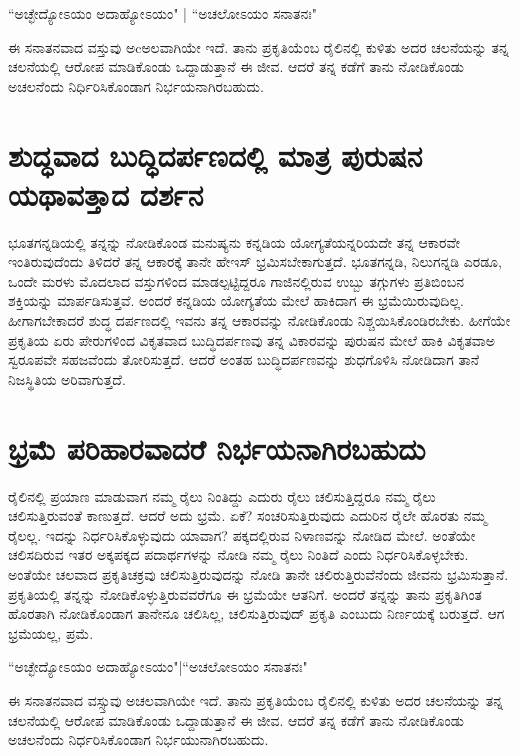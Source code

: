 \begin{shloka}
``ಅಚ್ಛೇದ್ಯೋಽಯಂ ಅದಾಹ್ಯೋಽಯಂ" | ``ಅಚಲೋಽಯಂ ಸನಾತನಃ"
\end{shloka}

ಈ ಸನಾತನವಾದ ವಸ್ತುವು ಅcಅಲವಾಗಿಯೇ ಇದೆ. ತಾನು ಪ್ರಕೃತಿಯೆಂಬ ರೈಲಿನಲ್ಲಿ ಕುಳಿತು ಅದರ ಚಲನೆಯನ್ನು ತನ್ನ ಚಲನೆಯಲ್ಲಿ ಆರೋಪ ಮಾಡಿಕೊಂಡು ಒದ್ದಾಡುತ್ತಾನೆ ಈ ಜೀವ. ಆದರೆ ತನ್ನ ಕಡೆಗೆ ತಾನು ನೋಡಿಕೊಂಡು ಅಚಲನೆಂದು ನಿರ್ಧಿರಿಸಿಕೊಂಡಾಗ ನಿರ್ಭಯನಾಗಿರಬಹುದು.

\section*{ಶುದ್ಧವಾದ ಬುದ್ಧಿದರ್ಪಣದಲ್ಲಿ ಮಾತ್ರ ಪುರುಷನ ಯಥಾವತ್ತಾದ ದರ್ಶನ}

ಭೂತಗನ್ನಡಿಯಲ್ಲಿ  ತನ್ನನ್ನು ನೋಡಿಕೊಂಡ ಮನುಷ್ಯನು ಕನ್ನಡಿಯ ಯೋಗ್ಯತೆಯನ್ನರಿಯದೇ ತನ್ನ ಆಕಾರವೇ ಇಂತಿರುವುದೆಂದು ತಿಳಿದರೆ ತನ್ನ ಆಕಾರಕ್ಕೆ ತಾನೇ ಹೇಇಸ್ ಭ್ರಮಿಸಬೇಕಾಗುತ್ತದೆ. ಭೂತಗನ್ನಡಿ, ನಿಲುಗನ್ನಡಿ ಎರಡೂ, ಒಂದೇ ಮರಳು ಮೊದಲಾದ ವಸ್ತುಗಳಿಂದ ಮಾಡಲ್ಪಟ್ಟಿದ್ದರೂ ಗಾಜಿನಲ್ಲಿರುವ ಉಬ್ಬು ತಗ್ಗುಗಳು ಪ್ರತಿಬಿಂಬನ ಶಕ್ತಿಯನ್ನು ಮಾರ್ಪಡಿಸುತ್ತವೆ. ಅಂದರೆ ಕನ್ನಡಿಯ ಯೋಗ್ಯತೆಯ ಮೇಲೆ ಹಾಕಿದಾಗ ಈ ಭ್ರಮೆಯಿರುವುದಿಲ್ಲ. ಹೀಗಾಗಬೇಕಾದರೆ ಶುದ್ಧ ದರ್ಪಣದಲ್ಲಿ ಇವನು ತನ್ನ ಆಕಾರವನ್ನು ನೋಡಿಕೊಂಡು ನಿಶ್ಚಯಿಸಿಕೊಂಡಿರಬೇಕು. ಹೀಗೆಯೇ ಪ್ರಕೃತಿಯ ಏರು ಪೇರುಗಳಿಂದ ವಿಕೃತವಾದ ಬುದ್ಧಿದರ್ಪಣವು ತನ್ನ ವಿಕಾರವನ್ನು ಪುರುಷನ ಮೇಲೆ ಹಾಕಿ ವಿಕೃತವಾಅ ಸ್ವರೂಪವೇ ಸಹಜವೆಂದು ತೋರಿಸುತ್ತದೆ. ಆದರೆ ಅಂತಹ ಬುದ್ಧಿದರ್ಪಣವನ್ನು ಶುಧಗೊಳಿಸಿ ನೋಡಿದಾಗ ತಾನೆ ನಿಜಸ್ಥಿತಿಯ ಅರಿವಾಗುತ್ತದೆ.

\section*{ಭ್ರಮೆ ಪರಿಹಾರವಾದರೆ ನಿರ್ಭಯನಾಗಿರಬಹುದು}

ರೈಲಿನಲ್ಲಿ ಪ್ರಯಾಣ ಮಾಡುವಾಗ ನಮ್ಮ ರೈಲು ನಿಂತಿದ್ದು ಎದುರು ರೈಲು ಚಲಿಸುತ್ತಿದ್ದರೂ ನಮ್ಮ ರೈಲು ಚಲಿಸುತ್ತಿರುವಂತೆ ಕಾಣುತ್ತದೆ. ಆದರೆ ಅದು ಭ್ರಮೆ. ಏಕೆ? ಸಂಚರಿಸುತ್ತಿರುವುದು ಎದುರಿನ ರೈಲೇ ಹೊರತು ನಮ್ಮ ರೈಲಲ್ಲ. ಇದನ್ನು ನಿರ್ಧರಿಸಿಕೊಳ್ಳುವುದು ಯಾವಾಗ? ಪಕ್ಕದಲ್ಲಿರುವ ನಿಳಾಣವನ್ನು ನೋಡಿದ ಮೇಲೆ. ಅಂತೆಯೇ ಚಲಿಸದಿರುವ ಇತರ ಅಕ್ಕಪಕ್ಕದ ಪದಾರ್ಥಗಳನ್ನು ನೋಡಿ ನಮ್ಮ ರೈಲು ನಿಂತಿದೆ ಎಂದು ನಿರ್ಧರಿಸಿಕೊಳ್ಳಬೇಕು. ಅಂತೆಯೇ ಚಲವಾದ ಪ್ರಕೃತಿಚಕ್ರವು ಚಲಿಸುತ್ತಿರುವುದನ್ನು ನೋಡಿ ತಾನೇ ಚಲಿರುತ್ತಿರುವೆನೆಂದು ಜೀವನು ಭ್ರಮಿಸುತ್ತಾನೆ. ಪ್ರಕೃತಿಯಲ್ಲಿ ತನ್ನನ್ನು ನೋಡಿಕೊಳ್ಳುತ್ತಿರುವವರೆಗೂ ಈ ಭ್ರಮೆಯೇ ಆತನಿಗೆ. ಅಂದರೆ ತನ್ನನ್ನು ತಾನು ಪ್ರಕೃತಿಗಿಂತ ಹೊರತಾಗಿ ನೋಡಿಕೊಂಡಾಗ ತಾನೇನೂ ಚಲಿಸಿಲ್ಲ, ಚಲಿಸುತ್ತಿರುವುದ್ ಪ್ರಕೃತಿ ಎಂಬುದು ನಿರ್ಣಯಕ್ಕೆ ಬರುತ್ತದೆ. ಆಗ ಭ್ರಮೆಯಲ್ಲ, ಪ್ರಮೆ.

\begin{shloka}
``ಅಚ್ಛೇದ್ಯೋಽಯಂ ಅದಾಹ್ಯೋಽಯಂ"|``ಅಚಲೋಽಯಂ ಸನಾತನಃ"
\end{shloka}

ಈ ಸನಾತನವಾದ ವಸ್ಸ್ತುವು ಅಚಲವಾಗಿಯೇ ಇದೆ. ತಾನು ಪ್ರಕೃತಿಯೆಂಬ ರೈಲಿನಲ್ಲಿ ಕುಳಿತು ಅದರ ಚಲನೆಯನ್ನು ತನ್ನ ಚಲನೆಯಲ್ಲಿ ಆರೋಪ ಮಾಡಿಕೊಂಡು ಒದ್ದಾಡುತ್ತಾನೆ ಈ ಜೀವ. ಆದರೆ ತನ್ನ ಕಡೆಗೆ ತಾನು ನೋಡಿಕೊಂಡು ಅಚಲನೆಂದು ನಿರ್ಧರಿಸಿಕೊಂಡಾಗ ನಿರ್ಭಯುನಾಗಿರಬಹುದು.

